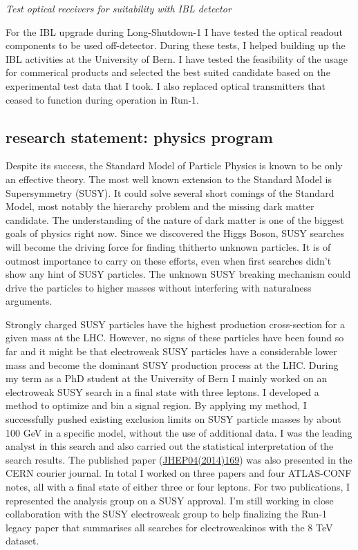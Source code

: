 \documentclass[]{cv} %
\begin{document}
\begin{researchexperience}
\vspace{15pt}
\Large{}
\textit{Test optical receivers for suitability with IBL detector} \\
\normalsize{}

For the IBL upgrade during Long-Shutdown-1 I have tested the optical readout
components to be used off-detector. During these tests, I helped building up the
IBL activities at the University of Bern. I have tested the feasibility of the
usage for commerical products and selected the best suited candidate based on
the experimental test data that I took. I also replaced optical transmitters
that ceased to function during operation in Run-1.

\end{researchexperience}

\ifstatements
\begin{statement}

\section{research statement: physics program}

Despite its success, the Standard Model of Particle Physics is known to be only
an effective theory. The most well known extension to the Standard Model is
Supersymmetry (SUSY). It could solve several short comings of the Standard
Model, most notably the hierarchy problem and the missing dark matter candidate.
The understanding of the nature of dark matter is one of the biggest goals of
physics right now. Since we discovered the Higgs Boson, SUSY searches will
become the driving force for finding thitherto unknown particles. It is of
outmost importance to carry on these efforts, even when first searches didn't
show any hint of SUSY particles. The unknown SUSY breaking mechanism could drive
the particles to higher masses without interfering with naturalness arguments.

Strongly charged SUSY particles have the highest production cross-section for a
given mass at the LHC. However, no signs of these particles have been found so
far and it might be that electroweak SUSY particles have a considerable lower
mass and become the dominant SUSY production process at the LHC. During my term
as a PhD student at the University of Bern I mainly worked on an electroweak
SUSY search in a final state with three leptons. I developed a method to
optimize and bin a signal region. By applying my method, I successfully pushed
existing exclusion limits on SUSY particle masses by about 100 GeV in a specific
model, without the use of additional data. I was the leading analyst in this
search and also carried out the statistical interpretation of the search
results. The published paper
(\href{http://dx.doi.org/10.1007/JHEP04(2014)169}{JHEP04(2014)169}) was also
presented in the CERN courier journal. In total I worked on three papers and
four ATLAS-CONF notes, all with a final state of either three or four leptons.
For two publications, I represented the analysis group on a SUSY approval. I'm
still working in close collaboration with the SUSY electroweak group to help
finalizing the Run-1 legacy paper that summarises all searches for
electroweakinos with the 8 TeV dataset.


\end{statement}
\end{document}
